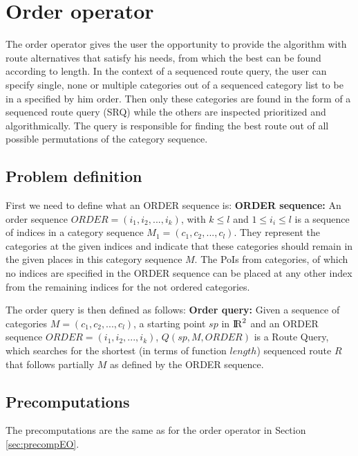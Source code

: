 

\section{Order operator}
The order operator gives the user the opportunity to provide the algorithm with route alternatives that satisfy his needs, from which the best can be found according to length.  In the context of a sequenced route query, the user can specify single, none or multiple categories out of a sequenced category list to be in a specified by him order. Then only these categories are found in the form of a sequenced route query (SRQ) while the others are inspected prioritized and algorithmically. The query is responsible for finding the best route out of all possible permutations of the category sequence.

\subsection{Problem definition} 
\label{sec:problemOrder}
First we need to define what an ORDER sequence is:\newline
\textbf{ORDER sequence:} An order sequence $ORDER = (i_1, i_2, ..., i_k)$, with $k \leq l$ and $1 \leq i_i \leq l$ is a sequence of indices in a category sequence $M_1 = (c_1, c_2, ..., c_l)$. They represent the categories at the given indices and indicate that these categories should remain in the given places in this category sequence $M$. The PoIs from categories, of which no indices are specified in the ORDER sequence can be placed at any other index from the remaining indices for the not ordered categories. \newline

The order query is then defined as follows: \newline
\textbf{Order query:} Given a sequence of categories $M = (c_1, c_2, ..., c_l)$, a starting point $sp$ in ${\rm I\!R}^2$ and an ORDER sequence $ORDER = (i_1, i_2, ..., i_k)$, $Q(sp, M, ORDER)$ is a Route Query, which searches for the shortest (in terms of function $length$) sequenced route $R$ that follows partially $M$ as defined by the ORDER sequence.

\subsection{Precomputations} 
\label{sec:precompOrder}
The precomputations are the same as for the order operator in Section \ref{sec:precompEO}.

